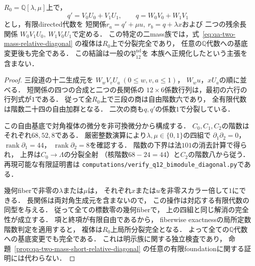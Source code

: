 \begin{lemma}[二massの四境界型を覆う明示的な対角解消の検査]
\label{lem:qa-q12-four-stratum-diagonal-check}
$R_0=\mathbb Q[\lambda,\mu]$上で，
\[
 q'=V_0U_0+V_1U_1,\qquad
 q=W_0V_0+W_1V_1
\]
とし，有限directed代数を
短関係$r_a=q'+\mu u,\ r_b=q+\lambda x$および
二つの残余長関係
$W_0V_1U_0,\ W_1V_0U_1$で定める．
この特定の二mass族では，式~\eqref{eq:qa-two-mass-relative-diagonal}
の複体は$R_0$上で分裂完全であり，
任意の$\mathbb Q$代数への基底変更後も完全である．
この結論は一般の$\mathfrak P_{12}^{\mathrm{nd}}$を
本族へ正規化したという主張を含まない．
\end{lemma}
\begin{proof}
三段道の十二生成元を
$W_wV_vU_a\ (0\leq w,v,a\leq1)$，
$W_wu$，$xU_a$の順に並べる．
短関係の四つの合成と二つの長関係の
$12\times6$係数行列は，最初の六行の行列式が$1$である．
従って全$R_0$上で三段の商は自由階数六であり，
全有限代数は階数二十四の自由加群となる．
二次の商も$q,q'$の係数$1$で分裂している．

この自由基底で対角複体の微分を非可換微分から構成する．
$C_0,C_1,C_2$の階数はそれぞれ$68,52,8$である．
厳密整数演算により$\lambda,\mu\in\{0,1\}$の四組で
$\partial_1\partial_2=0$，
$\operatorname{rank}\partial_1=44$，
$\operatorname{rank}\partial_2=8$を確認する．
階数の下界は法$101$の消去計算で得られ，
上界は$C_0\to\Lambda$の分裂全射
（核階数$68-24=44$）と$C_2$の階数八から従う．
再現可能な有限証明書は
\texttt{computations/verify\_q12\_bimodule\_diagonal.py}である．

幾何fiberで非零の$\lambda$または$\mu$は，
それぞれ$x$または$u$を非零スカラー倍して$1$にできる．
長関係は両対角生成元を含まないので，
この操作は対応する有限代数の同型を与える．
従って全ての標数零の幾何fiberで，
上の四組と同じ解消の完全性が成立する．
項と終項が有限自由であるから，
fiberwise exactnessの局所定数階数判定を適用すると，
複体は$R_0$上局所分裂完全となる．
よって全ての$\mathbb Q$代数への基底変更でも完全である．
これは明示族に関する独立検査であり，
命題~\ref{prop:qa-two-mass-short-relative-diagonal}
の任意の有限foundationに関する証明には代わらない．
\end{proof}

